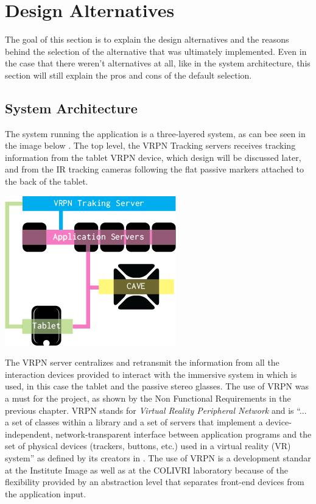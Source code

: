 \section{Design Alternatives}
The goal of this section is to explain the design alternatives and the reasons behind the selection of the alternative that was ultimately implemented. Even in the case that there weren't alternatives at all, like in the system architecture, this section will still explain the pros and cons of the default selection.
\subsection{System Architecture}
The system running the application is a three-layered system, as can bee seen in the image below . The top level, the VRPN Tracking servers receives tracking information from the tablet VRPN device, which design will be discussed later, and from the IR tracking cameras following the flat passive markers attached to the back of the tablet.

\begin{center}
\includegraphics[scale=0.75]{Images/architecture.png}
\label{fig:architecture}
\end{center}

The VRPN server centralizes and retransmit the information from all the interaction devices provided to interact with the immersive system in which is used, in this case the tablet and the passive stereo glasses. The use of VRPN was a must for the project, as shown by the Non Functional Requirements in the previous chapter. VRPN stands for \emph{Virtual Reality Peripheral Network} and is ``... a set of classes within a library and a set of servers that implement a device-independent, network-transparent interface between application programs and the set of physical devices (trackers, buttons, etc.) used in a virtual reality (VR) system'' as defined by its creators in \cite{vrpn}. The use of VRPN is a development standar at the Institute Image as well as at the COLIVRI laboratory because of the flexibility provided by an abstraction level that separates front-end devices from the application input.

